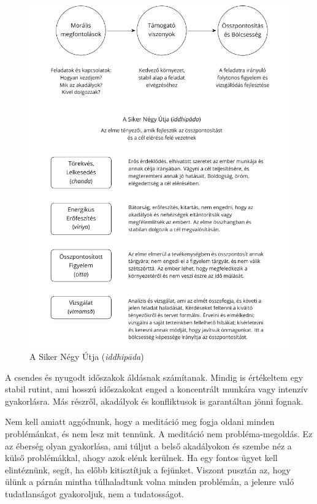 \begin{figure}[h]
\caption{A Siker Négy Útja (\emph{iddhipāda})}\label{fig-success}

\centering

\includegraphics[width=\linewidth]{./manuscript/tex/diagrams/paths-to-success-hu.pdf}

\end{figure}

\vfill\null
\clearpage

A csendes és nyugodt időszakok áldásnak számítanak. Mindig is értékeltem
egy stabil rutint, ami hosszú időszakokat enged a koncentrált munkára
vagy intenzív gyakorlásra. Más részről, akadályok és konfliktusok is
garantáltan jönni fognak.

Nem kell amiatt aggódnunk, hogy a meditáció meg fogja oldani minden
problémánkat, és nem lesz mit tennünk. A meditáció nem
probléma-megoldás. Ez az éberség olyan gyakorlása, ami túljut a belső
akadályokon és szembe néz a külső problémákkal, ahogy azok elénk
kerülnek. Ha egy fontos ügyet kell elintéznünk, segít, ha előbb
kitisztítjuk a fejünket. Viszont pusztán az, hogy ülünk a párnán mintha
túlhaladtunk volna minden problémán, a jelenre való tudatlanságot
gyakoroljuk, nem a tudatosságot.


